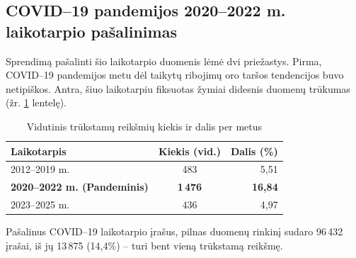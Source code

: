 \documentclass[]{VUMIFTemplateClass}
\begin{document}
    \subsection{COVID--19 pandemijos 2020--2022 m. laikotarpio pašalinimas}
    Sprendimą pašalinti šio laikotarpio duomenis lėmė dvi priežastys.
    Pirma, COVID--19 pandemijos metu dėl taikytų ribojimų oro taršos tendencijos buvo netipiškos.
    Antra, šiuo laikotarpiu fiksuotas žymiai didesnis  duomenų trūkumas (žr. \ref{tab:pm25_yearly_comparison} lentelę).
    \begin{table}[H]
        \centering
        \caption{Vidutinis trūkstamų  reikšmių kiekis ir dalis per metus}
        \small
        \setlength{\tabcolsep}{12pt}
        \begin{tabular}{|l|c|r|}
            \hline
            \textbf{Laikotarpis}                & \textbf{Kiekis (vid.)} & \textbf{Dalis (\%)} \\
            \hline
            2012--2019 m.                       & 483                    & 5,51                \\
            \textbf{2020--2022 m. (Pandeminis)} & \textbf{1\,476}        & \textbf{16,84}      \\
            2023--2025 m.                       & 436                    & 4,97                \\
            \hline
        \end{tabular}
        \label{tab:pm25_yearly_comparison}
    \end{table}
    Pašalinus COVID--19 laikotarpio įrašus, pilnas duomenų rinkinį sudaro 96\,432 įrašai, iš jų 13\,875 (14,4\%) -- turi bent vieną trūkstamą reikšmę.
\end{document}
